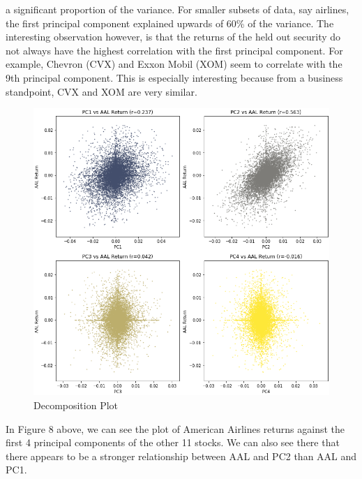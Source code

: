 \documentclass{article}
\begin{document}
a significant proportion of the variance. For smaller subsets of data, say airlines,
the first principal component explained upwards of 60\% of the variance. The 
interesting observation however, is that the returns of the held out security do
not always have the highest correlation with the first principal component. For 
example, Chevron (CVX) and Exxon Mobil (XOM) seem to correlate with the 9th principal
component. This is especially interesting because from a business standpoint, CVX
and XOM are very similar.
\begin{figure}[h!]
  \centering
    \includegraphics[width=.6\linewidth]{../Figures/PCA_plot.png}
    \caption{Decomposition Plot}
\end{figure}
In Figure 8 above, we can see the plot of American Airlines returns against the 
first 4 principal components of the other 11 stocks. We can also see there that
there appears to be a stronger relationship between AAL and PC2 than AAL and PC1.
\end{document}
